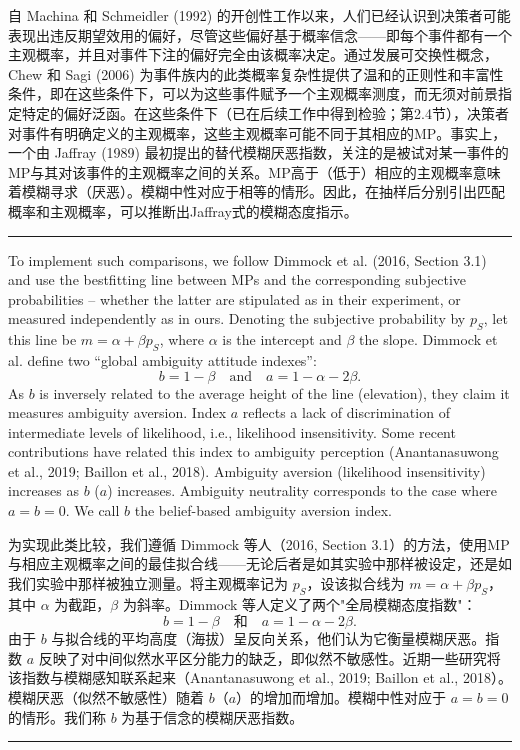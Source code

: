 \documentclass[12pt,a4paper]{article}
\newenvironment{original}
  {\par\vspace{0.5em}\noindent\color{black}\ignorespaces}
  {\par\vspace{0.3em}}
\newenvironment{translation}
  {\par\noindent\color{transblue}\ignorespaces}
  {\par\vspace{0.8em}\hrule\vspace{0.5em}}
\begin{document}
\begin{translation}
自 Machina 和 Schmeidler (1992) 的开创性工作以来，人们已经认识到决策者可能表现出违反期望效用的偏好，尽管这些偏好基于概率信念——即每个事件都有一个主观概率，并且对事件下注的偏好完全由该概率决定。通过发展可交换性概念，Chew 和 Sagi (2006) 为事件族内的此类概率复杂性提供了温和的正则性和丰富性条件，即在这些条件下，可以为这些事件赋予一个主观概率测度，而无须对前景指定特定的偏好泛函。在这些条件下（已在后续工作中得到检验；第2.4节），决策者对事件有明确定义的主观概率，这些主观概率可能不同于其相应的MP。事实上，一个由 Jaffray (1989) 最初提出的替代模糊厌恶指数，关注的是被试对某一事件的MP与其对该事件的主观概率之间的关系。MP高于（低于）相应的主观概率意味着模糊寻求（厌恶）。模糊中性对应于相等的情形。因此，在抽样后分别引出匹配概率和主观概率，可以推断出Jaffray式的模糊态度指示。
\end{translation}

\begin{original}
To implement such comparisons, we follow Dimmock et al. (2016, Section 3.1) and use the bestfitting line between MPs and the corresponding subjective probabilities -- whether the latter are stipulated as in their experiment, or measured independently as in ours. Denoting the subjective probability by $p_S$, let this line be $m = \alpha + \beta p_S$, where $\alpha$ is the intercept and $\beta$ the slope. Dimmock et al. define two ``global ambiguity attitude indexes'':
\begin{equation}
b = 1 - \beta \quad \text{and} \quad a = 1 - \alpha - 2\beta. \label{eq:indices}
\end{equation}
As $b$ is inversely related to the average height of the line (elevation), they claim it measures ambiguity aversion. Index $a$ reflects a lack of discrimination of intermediate levels of likelihood, i.e., likelihood insensitivity. Some recent contributions have related this index to ambiguity perception (Anantanasuwong et al., 2019; Baillon et al., 2018). Ambiguity aversion (likelihood insensitivity) increases as $b$ ($a$) increases. Ambiguity neutrality corresponds to the case where $a = b = 0$. We call $b$ the belief-based ambiguity aversion index.
\end{original}

\begin{translation}
为实现此类比较，我们遵循 Dimmock 等人（2016, Section 3.1）的方法，使用MP与相应主观概率之间的最佳拟合线——无论后者是如其实验中那样被设定，还是如我们实验中那样被独立测量。将主观概率记为 $p_S$，设该拟合线为 $m = \alpha + \beta p_S$，其中 $\alpha$ 为截距，$\beta$ 为斜率。Dimmock 等人定义了两个"全局模糊态度指数"：
\begin{equation}
b = 1 - \beta \quad \text{和} \quad a = 1 - \alpha - 2\beta.
\end{equation}
由于 $b$ 与拟合线的平均高度（海拔）呈反向关系，他们认为它衡量模糊厌恶。指数 $a$ 反映了对中间似然水平区分能力的缺乏，即似然不敏感性。近期一些研究将该指数与模糊感知联系起来（Anantanasuwong et al., 2019; Baillon et al., 2018）。模糊厌恶（似然不敏感性）随着 $b$（$a$）的增加而增加。模糊中性对应于 $a = b = 0$ 的情形。我们称 $b$ 为基于信念的模糊厌恶指数。
\end{translation}
\end{document}
